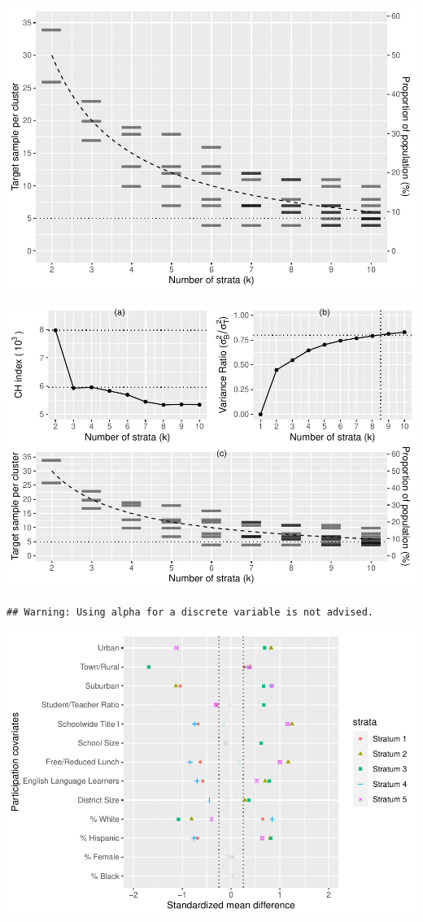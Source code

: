 \documentclass[
  man,floatsintext]{apa6}
\begin{document}
\includegraphics{5---Analysis_files/figure-latex/unnamed-chunk-7-1.pdf}

\includegraphics{5---Analysis_files/figure-latex/unnamed-chunk-8-1.pdf}

\begin{verbatim}
## Warning: Using alpha for a discrete variable is not advised.
\end{verbatim}

\includegraphics{5---Analysis_files/figure-latex/unnamed-chunk-10-1.pdf}
\end{document}
